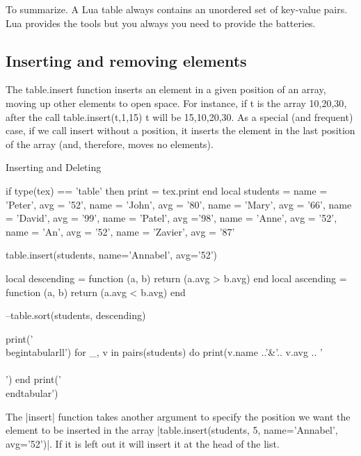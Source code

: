 \begin{scriptexample}{}{}
To summarize. A Lua table always contains an unordered set of key-value pairs. Lua provides the tools but you always you need to provide the batteries.
\end{scriptexample}

\subsection{Inserting and removing elements}

The table.insert function inserts an element in a given position of an array,
moving up other elements to open space. For instance, if t is the array
{10,20,30}, after the call table.insert(t,1,15) t will be {15,10,20,30}. As
a special (and frequent) case, if we call insert without a position, it inserts the
element in the last position of the array (and, therefore, moves no elements).


\begin{texexample}{Inserting and Deleting}{}
\begin{luacode}
if type(tex) == 'table' then print = tex.print end
local students = {
  {name = 'Peter', avg = '52'}, 
  {name = 'John', avg = '80'},
  {name = 'Mary', avg = '66'},
  {name = 'David', avg = '99'}, 
  {name = 'Patel', avg ='98'},
  {name = 'Anne', avg = '52'},
  {name = 'An', avg = '52'},
  {name = 'Zavier', avg = '87'} 
}

table.insert(students, {name='Annabel', avg='52'})

local descending = function (a, b) return (a.avg > b.avg) end
local ascending = function (a, b) return (a.avg < b.avg) end

--table.sort(students, descending)   

print('\\begin{tabular}{ll}')
for _, v in pairs(students) do
   print(v.name ..'&'..  v.avg .. '\\\\')
end
print('\\end{tabular}')
\end{luacode}

\end{texexample}

The |insert| function takes another argument to specify the position we want the element to be inserted in the array |table.insert(students, 5, {name='Annabel', avg='52'})|. If it is left out it will insert it at the head of the list.

